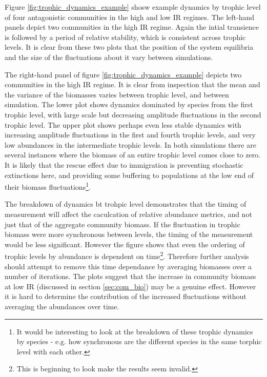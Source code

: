 \begin{itemize}
\begin{figure}
\end{figure}

Figure \ref{fig:trophic_dynamics_example} shosw example dynamics by trophic level of four antagonistic communities in the high and low IR regimes. The left-hand panels depict two communities in the high IR regime. Again the intial transience is followed by a period of relative stability, which is consistent across trophic levels. It is clear from these two plots that the position of the system equilibria and the size of the fluctuations about it vary between simulations.  

The right-hand panel of figure \ref{fig:trophic_dynamics_example} depicts two communities in the high IR regime. It is clear from inspection that the mean and the variance of the biomasses varies between trophic level, and between simulation. The lower plot shows dynamics dominated by species from the first trophic level, with large scale but decreasing amplitude fluctuations in the second trophic level. The upper plot shows perhaps even less stable dynamics with increasing amplitude fluctuations in the first and fourth trophic levels, and very low abundances in the intermediate trophic levels. In both simulations there are several instances where the biomass of an entire trophic level comes close to zero. It is likely  that the rescue effect due to immigration is preventing stochastic extinctions here, and providing some buffering to populations at the low end of their biomass fluctuations\footnote{It would be interesting to look at the breakdown of these trophic dynamics by species - e.g. how synchronous are the different species in the same torphic level with each other.}.

The breakdown of dynamics bt trohpic level demonstrates that the timing of measurement will affect the caculcation of relative abundance metrics, and not just that of the aggregate community biomass. If the fluctuation in trophic biomass were more synchronous between levels, the timing of the measurement would be less significant. However the figure shows that even the ordering of trophic levels by abundance is dependent on time\footnote{This is beginning to look make the results seem invalid.}. Therefore further analysis should attempt to remove this time dependance by averaging biomasses over a number of iterations. The plots suggest that the increase in community biomass at low IR (discussed in section \ref{sec:com_bio}) may be a genuine effect. However it is hard to determine the contribution of the increased fluctuations without averaging the abundances over time.


\end{itemize}
